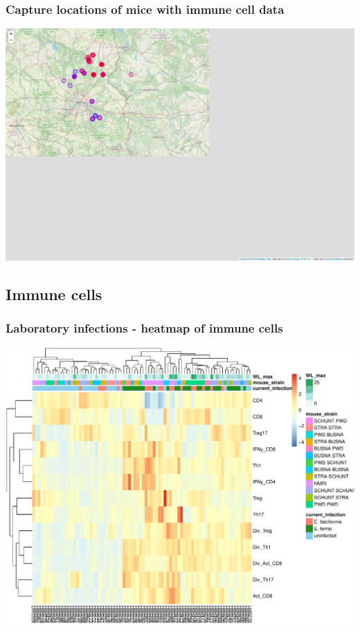 \documentclass[
]{article}
\begin{document}
\subsubsection{Capture locations of mice with immune cell
data}\label{capture-locations-of-mice-with-immune-cell-data}

\includegraphics{Explorative_Stats_experimental_planning_files/figure-latex/unnamed-chunk-12-1.pdf}

\subsection{Immune cells}\label{immune-cells}

\subsubsection{Laboratory infections - heatmap of immune
cells}\label{laboratory-infections---heatmap-of-immune-cells}

\includegraphics{Explorative_Stats_experimental_planning_files/figure-latex/HEATMAP_lab_facs-1.pdf}
\end{document}
